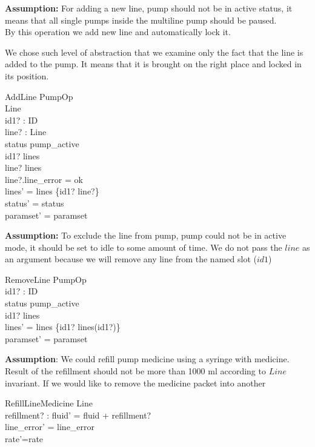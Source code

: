 \documentclass{article}
\begin{document}
		\textbf{Assumption:} For adding a new line, pump should not be in active status, it means that all single pumps inside the multiline pump should be paused.\\
		By this operation we add new line and automatically lock it.

We chose such level of abstraction that we examine only the fact that the line is added to the pump. It means that it is brought on the right place and locked in its position.

    \begin{schema}{AddLine}
    	PumpOp\\
		\Xi Line \\
		id1? : ID \\
		line? : Line \\
	\where
	    status \neq pump\_active \\
		id1? \notin \dom lines \\
		line? \notin \ran lines \\
		line?.line\_error = ok\\
    	lines' = lines \cup \{id1? \mapsto line?\} \\
    	status' = status \\
    	paramset' = paramset\\
	\end{schema}

	
\textbf{Assumption:} To exclude the line from pump, pump could not be in active mode, it should be set to idle to some amount of time. We do not pass the $line$ as an argument because we will remove any line from the named slot ($id1$)

	\begin{schema}{RemoveLine}
		PumpOp \\
		id1? : ID \\
	\where
		status \neq pump\_active \\
		id1? \in \dom lines \\
		lines' = lines \setminus \{id1? \mapsto lines(id1?)\} \\
    	paramset' = paramset\\ 	
	\end{schema}
	

\textbf{Assumption}: We could refill pump medicine using a syringe with medicine. Result of the refillment should not be more than 1000 ml according to $Line$ invariant.
If we would like to remove the medicine packet into another 

	\begin{schema}{RefillLineMedicine}
		\Delta Line \\
		refillment? : \nat
	\where
	    fluid' = fluid + refillment? \\
		line\_error' = line\_error \\
		rate'=rate
	\end{schema}
	
\end{document}
